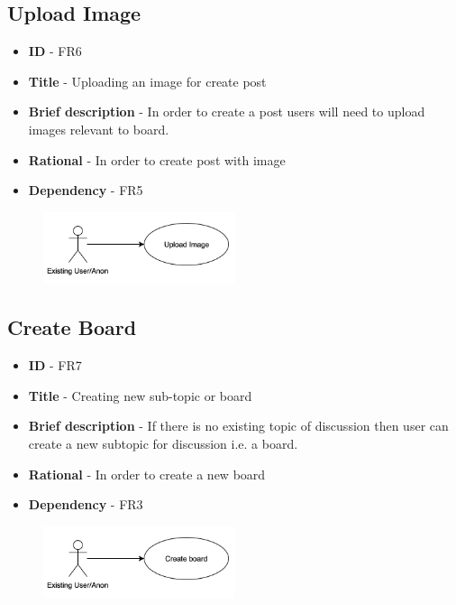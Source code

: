 \documentclass[12pt]{report}
\begin{document}
\subsection{Upload Image}
\begin{itemize}
    \item \textbf{ID} - FR6
    \item \textbf{Title} - Uploading an image for create post
    \item \textbf{Brief description} - In order to create a post users will need to upload images relevant to board.
    \item \textbf{Rational} - In order to create post with image
    \item \textbf{Dependency} - FR5
\end{itemize}
\begin{figure}[h]
\includegraphics[width=0.5\textwidth]{uploadimage.png}
\end{figure}

\subsection{Create Board}
\begin{itemize}
    \item \textbf{ID} - FR7
    \item \textbf{Title} - Creating new sub-topic or board
    \item \textbf{Brief description} - If there is no existing topic of discussion then user can create a new subtopic for discussion i.e. a board.
    \item \textbf{Rational} - In order to create a new board
    \item \textbf{Dependency} - FR3
\end{itemize}
\begin{figure}[h]
\includegraphics[width=0.5\textwidth]{createboard.png}
\end{figure}
\end{document}
